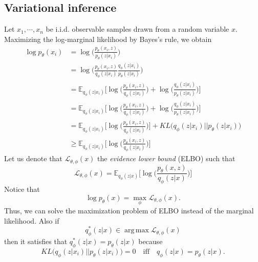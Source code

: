 \documentclass[12pt]{report}
\theoremstyle{definition}
\theoremstyle{remark}
\newcommand{\E}{\mathbb{E}}
\DeclareMathOperator*{\argmax}{arg\,max}
\begin{document}
\subsection{Variational inference}
Let $x_{1},\cdots, x_{n}$ be i.i.d. observable samples drawn from a random variable $x$. Maximizing the log-marginal likelihood by Bayes's rule, we obtain
\begin{equation}
  \begin{split}
    \log p_{\theta}(x_{i}) &= \log\Big( \frac{p_{\theta}(x_{i},z)}{p_{\theta}(z|x_{i})}\Big)\\
    &= \log\Big( \frac{p_{\theta}(x_{i},z)}{q_{\phi}(z|x_{i})} \frac{q_{\phi}(z|x_{i})}{p_{\theta}(z|x_{i})}\Big)\\
    &= \E_{q_{\phi}(z|x_{i})}\bigg[\log\Big( \frac{p_{\theta}(x_{i},z)}{q_{\phi}(z|x_{i})}\Big) + \log\Big( \frac{q_{\phi}(z|x_{i})}{p_{\theta}(z|x_{i})}\Big)\bigg]\\
    &= \E_{q_{\phi}(z|x_{i})}\bigg[\log\Big( \frac{p_{\theta}(x_{i},z)}{q_{\phi}(z|x_{i})}\Big) + \log\Big( \frac{q_{\phi}(z|x_{i})}{p_{\theta}(z|x_{i})}\Big)\bigg]\\
    &= \E_{q_{\phi}(z|x_{i})}\bigg[\log\Big( \frac{p_{\theta}(x_{i},z)}{q_{\phi}(z|x_{i})}\Big)\bigg] + KL\big(q_{\phi}(z|x_{i}) \big|\big| p_{\theta}(z|x_{i})\big)\\
    &\geq \E_{q_{\phi}(z|x_{i})}\bigg[\log\Big( \frac{p_{\theta}(x_{i},z)}{q_{\phi}(z|x_{i})}\Big)\bigg]
  \end{split}
\end{equation}
Let us denote that $\mathcal{L}_{\theta, \phi}(x)$ the \textit{evidence lower bound} (ELBO) such that 
\begin{equation}
  \mathcal{L}_{\theta, \phi}(x) = \E_{q_{\phi}(z|x)}\bigg[\log\Big( \frac{p_{\theta}(x,z)}{q_{\phi}(z|x)}\Big)\bigg]
\end{equation}
Notice that 
\begin{equation}
  \log p_{\theta}(x) = \max_{\phi} \mathcal{L}_{\theta, \phi}(x).
\end{equation}
Thus, we can solve the maximization problem of ELBO instead of the marginal likelihood. Also if 
\begin{equation}
  q_{\phi}^{*}(z|x) \in \argmax\mathcal{L}_{\theta, \phi}(x)
\end{equation}
then it satisfies that $q_{\phi}^{*}(z|x) = p _{\theta}(z|x)$ because
\begin{equation}
  KL\big(q_{\phi}(z|x_{i}) \big|\big| p_{\theta}(z|x_{i})\big) = 0 \quad \text{iff} \quad q_{\phi}(z|x) = p _{\theta}(z|x).
\end{equation}
\end{document}
